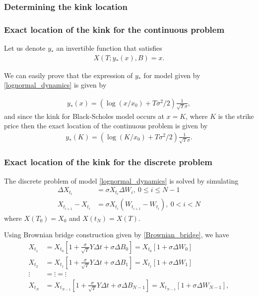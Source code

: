 \documentclass[11pt]{article}
\begin{document}
\subsubsection{Determining the kink location}\label{sec:Determining the kink location}
\subsubsection*{Exact location of the kink for the continuous problem}
Let us denote $y_{\ast}$ an invertible function that satisfies 
\begin{align}\label{eq: kink_point_problem}
	X(T;y_{\ast}(x),B)=x.
\end{align}

We can easily prove that the expression of $y_{\ast}$ for model given by \eqref{lognormal_dynamics} is given by

\begin{align}
	y_{\ast}(x)=\left(\operatorname{log}(x/x_0)+T \sigma^2/2\right) \frac{1}{\sqrt{T} \sigma}, 
\end{align}
and since the kink for Black-Scholes model occurs at $x=K$, where $K
$ is the strike price then  the exact location of the continuous problem is given by 
\begin{align}\label{xact_location_continuous_problem}
	y_{\ast}(K)=\left(\operatorname{log}(K/x_0)+T \sigma^2/2\right) \frac{1}{\sqrt{T} \sigma}.
\end{align}


\subsubsection*{Exact location of the kink for the discrete problem}
The discrete problem of model \eqref{lognormal_dynamics} is solved by simulating 
\begin{align}\label{Discrete_problem}
	\Delta X_{t_i}&=\sigma X_{t_i} \Delta W_{i},\: 0 \le i \le N-1 \nonumber\\
	X_{t_{i+1}}-X_{t_{i}}&=\sigma X_{t_i} \left(W_{t_{i+1}}-W_{t_i}\right),\: 0<i<N
\end{align}
where $X(T_0)=X_0$ and $X(t_N)=X(T)$. 

Using Brownian bridge construction given by \eqref{Brownian_bridge}, we have
\begin{align}
	X_{t_1}&= X_{t_0} \left[ 1+\frac{\sigma}{\sqrt{T}} Y \Delta t+ \sigma \Delta B_0\right]=X_{t_0} \left[ 1+\sigma \Delta W_0 \right] \nonumber\\
	X_{t_2}&= X_{t_1} \left[ 1+\frac{\sigma}{\sqrt{T}} Y \Delta t+ \sigma \Delta B_1\right]=X_{t_1} \left[ 1+\sigma \Delta W_1 \right] \nonumber\\
	\vdots &= \vdots =\vdots \nonumber\\
	X_{t_N}&= X_{t_{N-1}} \left[ 1+\frac{\sigma}{\sqrt{T}} Y \Delta t+ \sigma \Delta B_{N-1}\right]= X_{t_{N-1}}  \left[ 1+\sigma \Delta W_{N-1} \right],
\end{align}
\end{document}
